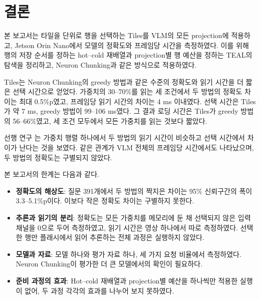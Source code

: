 \chapter{결론}\label{chap:conclusion}

본 보고서는 타일을 단위로 행을 선택하는 Tiles를 VLM의 모든 projection에 적용하고, Jetson Orin Nano에서 모델의 정확도와 프레임당 시간을 측정하였다. 이를 위해 행의 저장 순서를 정하는 hot--cold 재배열과 projection별 행 예산을 정하는 TEAL의 탐색을 정리하고, Neuron Chunking과 같은 방식으로 적용하였다.

Tiles는 Neuron Chunking의 greedy 방법과 같은 수준의 정확도와 읽기 시간을 더 짧은 선택 시간으로 얻었다. 가중치의 30--70\%를 읽는 세 조건에서 두 방법의 정확도 차이는 최대 0.5\%p였고, 프레임당 읽기 시간의 차이는 4 ms 이내였다. 선택 시간은 Tiles가 약 7 ms, greedy 방법이 99--106 ms였다. 그 결과 로딩 시간은 Tiles가 greedy 방법의 56--66\%였고, 세 조건 모두에서 모든 가중치를 읽는 것보다 짧았다.

선행 연구 \cite{seol2026}는 가중치 행렬 하나에서 두 방법의 읽기 시간이 비슷하고 선택 시간에서 차이가 난다는 것을 보였다. 같은 관계가 VLM 전체의 프레임당 시간에서도 나타났으며, 두 방법의 정확도는 구별되지 않았다.

본 보고서의 한계는 다음과 같다.

\begin{itemize}
\item \textbf{정확도의 해상도}: 질문 391개에서 두 방법의 짝지은 차이는 95\% 신뢰구간의 폭이 3.3--5.1\%p이다. 이보다 작은 정확도 차이는 구별하지 못한다.
\item \textbf{추론과 읽기의 분리}: 정확도는 모든 가중치를 메모리에 둔 채 선택되지 않은 입력 채널을 0으로 두어 측정하였고, 읽기 시간은 영상 하나에서 따로 측정하였다. 선택한 행만 플래시에서 읽어 추론하는 전체 과정은 실행하지 않았다.
\item \textbf{모델과 자료}: 모델 하나와 평가 자료 하나, 세 가지 요청 비율에서 측정하였다. Neuron Chunking이 평가한 더 큰 모델에서의 확인이 필요하다.
\item \textbf{준비 과정의 효과}: Hot--cold 재배열과 projection별 예산을 하나씩만 적용한 실행이 없어, 두 과정 각각의 효과를 나누어 보지 못하였다.
\end{itemize}

